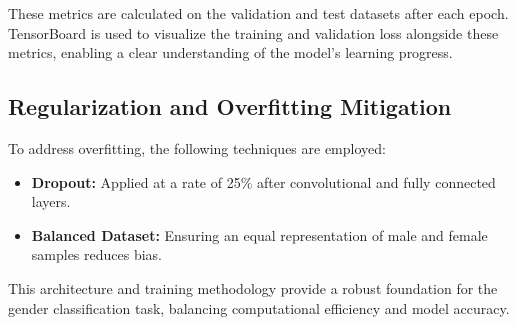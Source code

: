 These metrics are calculated on the validation and test datasets after each epoch. TensorBoard is used to visualize the training and validation loss alongside these metrics, enabling a clear understanding of the model's learning progress.

\subsection{Regularization and Overfitting Mitigation}
To address overfitting, the following techniques are employed:
\begin{itemize}
    \item \textbf{Dropout:} Applied at a rate of 25\% after convolutional and fully connected layers.
    \item \textbf{Balanced Dataset:} Ensuring an equal representation of male and female samples reduces bias.
\end{itemize}

This architecture and training methodology provide a robust foundation for the gender classification task, balancing computational efficiency and model accuracy.
